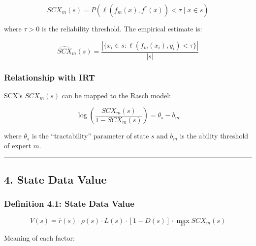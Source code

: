 \documentclass[
  12pt,
]{ctexart}
\begin{document}
\[SCX_m(s) = P(\ell(f_m(x), f^*(x)) < \tau \mid x \in s)\]

where \(\tau > 0\) is the reliability threshold. The empirical estimate is:

\[\widehat{SCX}_m(s) = \frac{|\{x_i \in s : \ell(f_m(x_i), y_i) < \tau\}|}{|s|}\]

\subsubsection{Relationship with IRT}\label{relationship-with-irt}

SCX's \(SCX_m(s)\) can be mapped to the Rasch model:

\[\log\left(\frac{SCX_m(s)}{1 - SCX_m(s)}\right) = \theta_s - b_m\]

where \(\theta_s\) is the ``tractability'' parameter of state \(s\) and \(b_m\) is the ability threshold of expert \(m\).

\begin{center}\rule{0.5\linewidth}{0.5pt}\end{center}

\subsection{4. State Data Value}\label{state-data-value}

\subsubsection{Definition 4.1: State Data Value}\label{definition-4.1-state-data-value}

\[V(s) = \bar{r}(s) \cdot \rho(s) \cdot L(s) \cdot [1 - D(s)] \cdot \max_m SCX_m(s)\]

Meaning of each factor:
\end{document}
